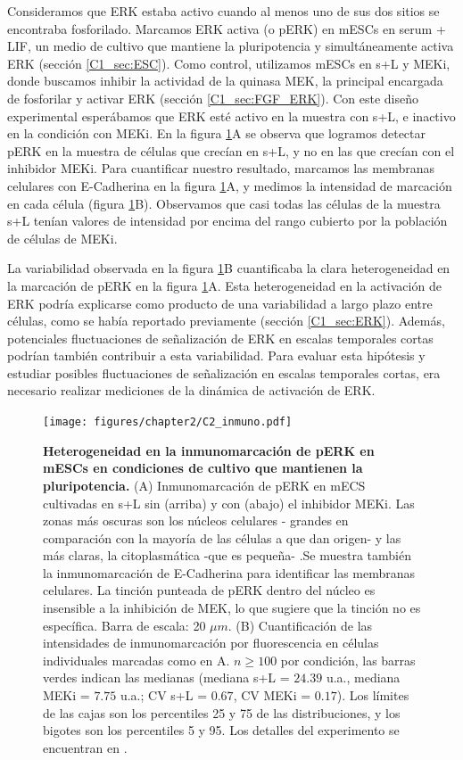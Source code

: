 \documentclass[./main.tex]{subfiles}
\begin{document}
Consideramos que ERK estaba activo cuando al menos uno de sus dos sitios se encontraba fosforilado. Marcamos ERK activa (o pERK) en mESCs en serum + LIF, un medio de cultivo que mantiene la pluripotencia y simultáneamente activa ERK (sección \ref{C1_sec:ESC}). Como control, utilizamos mESCs en s+L y MEKi, donde buscamos inhibir la actividad de la quinasa MEK, la principal encargada de fosforilar y activar ERK (sección \ref{C1_sec:FGF_ERK}). Con este diseño experimental esperábamos que ERK esté activo en la muestra con s+L, e inactivo en la condición con MEKi. En la figura \ref{C2_fig:inmuno}A se observa que logramos detectar pERK en la muestra de células que crecían en s+L, y no en las que crecían con el inhibidor MEKi. Para cuantificar nuestro resultado, marcamos las membranas celulares con E-Cadherina en la figura \ref{C2_fig:inmuno}A, y medimos la intensidad de marcación en cada célula (figura \ref{C2_fig:inmuno}B). Observamos que casi todas las células de la muestra s+L tenían valores de intensidad por encima del rango cubierto por la población de células de MEKi. 

La variabilidad observada en la figura \ref{C2_fig:inmuno}B cuantificaba la clara heterogeneidad en la marcación de pERK en la figura \ref{C2_fig:inmuno}A. Esta heterogeneidad en la activación de ERK podría explicarse como producto de una variabilidad a largo plazo entre células, como se había reportado previamente \cite{Deathridge2019} (sección \ref{C1_sec:ERK}). Además, potenciales fluctuaciones de señalización de ERK en escalas temporales cortas podrían también contribuir a esta variabilidad. Para evaluar esta hipótesis y estudiar posibles fluctuaciones de señalización en escalas temporales cortas, era necesario realizar mediciones de la dinámica de activación de ERK. 

\begin{figure}
    \centering
    \texttt{[image: figures/chapter2/C2\_inmuno.pdf]} 
    \caption{\textbf{Heterogeneidad en la inmunomarcación de pERK en mESCs en condiciones de cultivo que mantienen la pluripotencia.} (A) Inmunomarcación de pERK en mECS cultivadas en s+L sin (arriba) y con (abajo) el inhibidor MEKi. Las zonas más oscuras son los núcleos celulares - grandes en comparación con la mayoría de las células a que dan origen- y las más claras, la citoplasmática -que es pequeña- .Se muestra también la inmunomarcación de E-Cadherina para identificar las membranas celulares. La tinción punteada de pERK dentro del núcleo es insensible a la inhibición de MEK, lo que sugiere que la tinción no es específica. Barra de escala: 20 $\mu m$. (B) Cuantificación de las intensidades de inmunomarcación por fluorescencia en células individuales marcadas como en A. $n \geq 100$ por condición, las barras verdes indican las medianas (mediana s+L = $24.39$ u.a., mediana MEKi = $7.75$ u.a.; CV s+L = $0.67$, CV MEKi = $0.17$). Los límites de las cajas son los percentiles 25 y 75 de las distribuciones, y los bigotes son los percentiles 5 y 95. Los detalles del experimento se encuentran en \cite{Fabris2022}.}
    \label{C2_fig:inmuno}
\end{figure}
\end{document}
